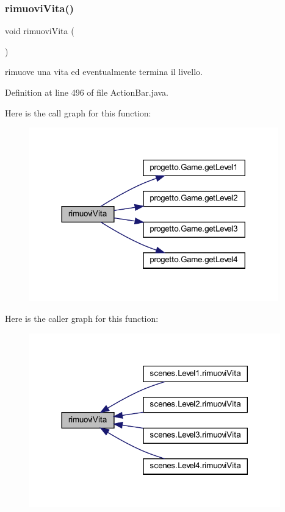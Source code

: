 \subsubsection{\texorpdfstring{rimuovi\+Vita()}{rimuoviVita()}}
{\footnotesize\ttfamily void rimuovi\+Vita (\begin{DoxyParamCaption}{ }\end{DoxyParamCaption})}



rimuove una vita ed eventualmente termina il livello. 



Definition at line 496 of file Action\+Bar.\+java.

Here is the call graph for this function\+:\nopagebreak
\begin{figure}[H]
\begin{center}
\leavevmode
\includegraphics[width=305pt]{classui_1_1_action_bar_a484775c889ccd8602b66ad795b141534_cgraph}
\end{center}
\end{figure}
Here is the caller graph for this function\+:\nopagebreak
\begin{figure}[H]
\begin{center}
\leavevmode
\includegraphics[width=308pt]{classui_1_1_action_bar_a484775c889ccd8602b66ad795b141534_icgraph}
\end{center}
\end{figure}


